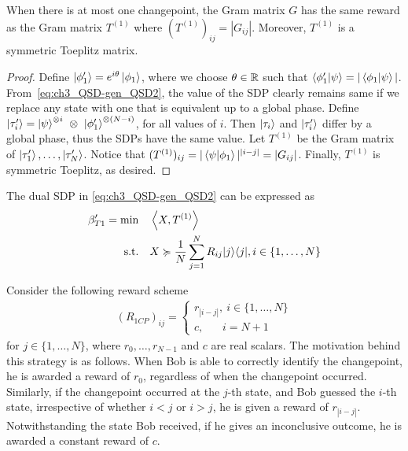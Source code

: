 \begin{lemma}
    \label{lem:ch3_QSD-T_sym_Toep}
    When there is at most one changepoint, the Gram matrix $G$ has the same reward as the Gram matrix $T^{(1)}$ where $(T^{(1)})_{ij} = |G_{ij}|$. Moreover, $T^{(1)}$ is a symmetric Toeplitz matrix.
\end{lemma}
\begin{proof}
    Define $\ket{\phi_1'} = e^{i \theta} \ket{\phi_1}$, where we choose $\theta \in \mathbb{R}$ such that $\braket{\phi_1'}{\psi} = |\braket{\phi_1}{\psi}|$.
    From~\eqref{eq:ch3_QSD-gen_QSD2}, the value of the SDP clearly remains same if we replace any state with one that is equivalent up to a global phase.
    Define $\ket{\tau_i'} = \ket{\psi}^{\otimes i}\ \otimes\ \ket{\phi_1'}^{\otimes (N-i)}$, for all values of $i$.
    Then $\ket{\tau_i}$ and $\ket{\tau_i'}$ differ by a global phase, thus the SDPs have the same value.
    Let $T^{(1)}$ be the Gram matrix of $\ket{\tau_1'}, \dots, \ket{\tau_N'}$.
    Notice that $(T^{(1)})_{ij} = |\braket{\psi}{\phi_1}|^{|i-j|} = |G_{ij}|$. 
    Finally, $T^{(1)}$ is symmetric Toeplitz, as desired. 
\end{proof} 

The dual SDP in \eqref{eq:ch3_QSD-gen_QSD2} can be expressed as
\begin{equation}
    \label{eq:ch3_QSD-1CP_Toep}
    \begin{aligned}
        \beta'_{T1} = \min \quad& \left\langle X, T^{(1)} \right\rangle \\
        \textrm{s.t.} \quad& X \succcurlyeq \frac{1}{N} \sum_{j=1}^N R_{ij} | j \rangle\langle j |, i \in \{1, \dots, N\} \\
    \end{aligned}
\end{equation}

Consider the following reward scheme
\begin{align}
    \label{eq:ch3_QSD-R_1CP}
    (R_{1CP})_{ij} = 
    \begin{cases}
        r_{|i - j|},\ i \in \{1, \dots, N\} \\
        c,\ \hspace{15pt}\ i = N + 1
    \end{cases}
\end{align}
for $j \in \{1, \dots, N\}$, where $r_0, \dots, r_{N-1}$ and $c$ are real scalars.
The motivation behind this strategy is as follows.
When Bob is able to correctly identify the changepoint, he is awarded a reward of $r_0$, regardless of when the changepoint occurred.
Similarly, if the changepoint occurred at the $j$-th state, and Bob guessed the $i$-th state, irrespective of whether $i < j$ or $i > j$, he is given a reward of $r_{|i-j|}$.
Notwithstanding the state Bob received, if he gives an inconclusive outcome, he is awarded a constant reward of $c$.

